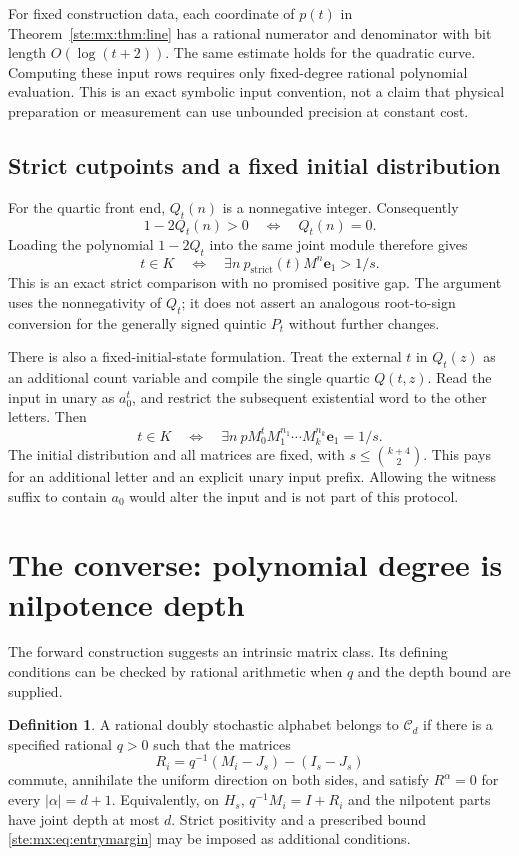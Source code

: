 \documentclass[11pt,letterpaper]{article}
\theoremstyle{definition}
\newtheorem{definition}[theorem]{Definition}
\theoremstyle{remark}
\newcommand{\e}{\mathbf e}
\begin{document}
For fixed construction data, each coordinate of $p(t)$ in
Theorem~\ref{ste:mx:thm:line} has a rational numerator and denominator with bit length
$O(\log(t+2))$. The same estimate holds for the quadratic curve. Computing
these input rows requires only fixed-degree rational polynomial evaluation.
This is an exact symbolic input convention, not a claim that physical
preparation or measurement can use unbounded precision at constant cost.

\subsection{Strict cutpoints and a fixed initial distribution}

For the quartic front end, $Q_t(n)$ is a nonnegative integer. Consequently
\[
 1-2Q_t(n)>0\quad\Longleftrightarrow\quad Q_t(n)=0.
\]
Loading the polynomial $1-2Q_t$ into the same joint module therefore gives
\begin{equation}\label{ste:mx:eq:strict}
 t\in K\quad\Longleftrightarrow\quad
 \exists n\ p_{\mathrm{strict}}(t)M^n\e_1>1/s.
\end{equation}
This is an exact strict comparison with no promised positive gap. The argument
uses the nonnegativity of $Q_t$; it does not assert an analogous root-to-sign
conversion for the generally signed quintic $P_t$ without further changes.

There is also a fixed-initial-state formulation. Treat the external $t$ in
$Q_t(z)$ as an additional count variable and compile the single quartic
$Q(t,z)$. Read the input in unary as $a_0^t$, and restrict the subsequent
existential word to the other letters. Then
\[
 t\in K\quad\Longleftrightarrow\quad
 \exists n\ pM_0^tM_1^{n_1}\cdots M_k^{n_k}\e_1=1/s.
\]
The initial distribution and all matrices are fixed, with
$s\leq\binom{k+4}{2}$. This pays for an additional letter and an explicit
unary input prefix. Allowing the witness suffix to contain $a_0$ would alter
the input and is not part of this protocol.

\section{The converse: polynomial degree is nilpotence depth}

The forward construction suggests an intrinsic matrix class. Its defining
conditions can be checked by rational arithmetic when $q$ and the depth bound
are supplied.

\begin{definition}
A rational doubly stochastic alphabet belongs to $\mathcal C_d$ if there is a
specified rational $q>0$ such that the matrices
\begin{equation}\label{ste:mx:eq:nilparts}
 R_i=q^{-1}(M_i-J_s)-(I_s-J_s)
\end{equation}
commute, annihilate the uniform direction on both sides, and satisfy
$R^\alpha=0$ for every $|\alpha|=d+1$. Equivalently, on $H_s$,
$q^{-1}M_i=I+R_i$ and the nilpotent parts have joint depth at most $d$.
Strict positivity and a prescribed bound \eqref{ste:mx:eq:entrymargin} may be imposed
as additional conditions.
\end{definition}
\end{document}
